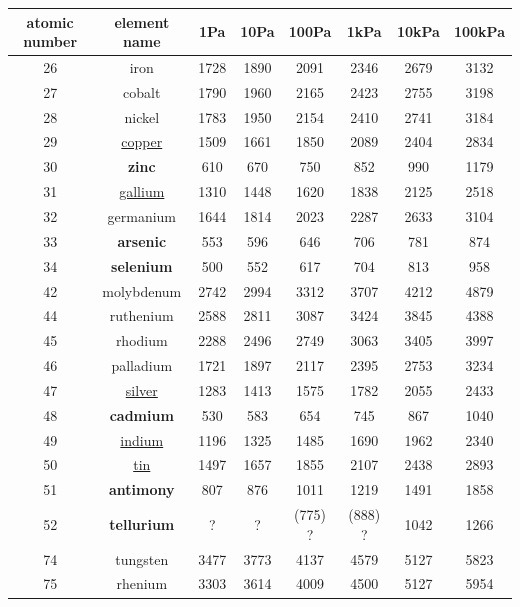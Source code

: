 \documentclass[a4paper]{article}
\begin{document}
	\begin{center}
		\begin{tabular}{|c|c|c|c|c|c|c|c|}
			\hline
			atomic number & element name & 1Pa & 10Pa & 100Pa & 1kPa & 10kPa & 100kPa \\
			\hline
			26 & iron & 1728 & 1890 & 2091 & 2346 & 2679 & 3132 \\
			\hline
			27 & cobalt & 1790 & 1960 & 2165 & 2423 & 2755 & 3198 \\
			\hline
			28 & nickel & 1783 & 1950 & 2154 & 2410 & 2741 & 3184 \\
			\hline
			29 & \underline{copper} & 1509 & 1661 & 1850 & 2089 & 2404 & 2834 \\
			\hline
			30 & \textbf{zinc} & 610 & 670 & 750 & 852 & 990 & 1179 \\
			\hline
			31 & \underline{gallium} & 1310 & 1448 & 1620 & 1838 & 2125 & 2518 \\
			\hline
			32 & germanium & 1644 & 1814 & 2023 & 2287 & 2633 & 3104 \\
			\hline
			33 & \textbf{arsenic} & 553 & 596 & 646 & 706 & 781 & 874 \\
			\hline
			34 & \textbf{selenium} & 500 & 552 & 617 & 704 & 813 & 958 \\
			\hline
			42 & molybdenum & 2742 & 2994 & 3312 & 3707 & 4212 & 4879 \\
			\hline
			44 & ruthenium & 2588 & 2811 & 3087 & 3424 & 3845 & 4388 \\
			\hline
			45 & rhodium & 2288 & 2496 & 2749 & 3063 & 3405 & 3997 \\
			\hline
			46 & palladium & 1721 & 1897 & 2117 & 2395 & 2753 & 3234 \\
			\hline
			47 & \underline{silver} & 1283 & 1413 & 1575 & 1782 & 2055 & 2433 \\
			\hline
			48 & \textbf{cadmium} & 530 & 583 & 654 & 745 & 867 & 1040 \\
			\hline
			49 & \underline{indium} & 1196 & 1325 & 1485 & 1690 & 1962 & 2340 \\
			\hline
			50 & \underline{tin} & 1497 & 1657 & 1855 & 2107 & 2438 & 2893 \\
			\hline
			51 & \textbf{antimony} & 807 & 876 & 1011 & 1219 & 1491 & 1858 \\
			\hline
			52 & \textbf{tellurium} & ? & ? & (775) ? & (888) ? & 1042 & 1266 \\
			\hline
			74 & tungsten & 3477 & 3773 & 4137 & 4579 & 5127 & 5823 \\
			\hline
			75 & rhenium & 3303 & 3614 & 4009 & 4500 & 5127 & 5954 \\

\end{tabular}
\end{center}
\end{document}
